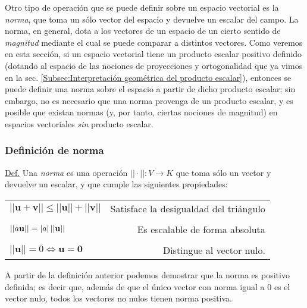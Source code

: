 Otro tipo de operación que se puede definir sobre un espacio vectorial es la \emph{norma}, que toma un sólo vector del espacio y devuelve un escalar del campo. La norma, en general, dota a los vectores de un espacio de un cierto sentido de \emph{magnitud} mediante el cual se puede comparar a distintos vectores. Como veremos en esta sección, si un espacio vectorial tiene un producto escalar positivo definido (dotando al espacio de las nociones de proyecciones y ortogonalidad que ya vimos en la sec. \ref{Subsec:Interpretación geométrica del producto escalar}), entonces se puede definir una norma sobre el espacio a partir de dicho producto escalar; sin embargo, no es necesario que una norma provenga de un producto escalar, y es posible que existan normas (y, por tanto, ciertas nociones de magnitud) en espacios vectoriales \emph{sin} producto escalar.

\subsubsection{Definición de norma} \label{Def:Norma}

\begin{tcolorbox}
\underline{Def.} Una \textit{norma} es una operación $||\cdot||:V\rightarrow K$ que toma sólo un vector y devuelve un escalar, y que cumple las siguientes propiedades:

\begin{center}
    \begin{tabular}{lr}
        $||\mathbf{u}+\mathbf{v}|| \leq ||\mathbf{u}|| + ||\mathbf{v}||$ & Satisface la desigualdad del triángulo \\ \\
        $||a\mathbf{u}|| = |a|\hspace{0.5mm}||\mathbf{u}||$ & Es escalable de forma absoluta \\ \\
        $||\mathbf{u}||=0\iff \mathbf{u}=\mathbf{0}$ & Distingue al vector nulo.
    \end{tabular}
\end{center}

\end{tcolorbox}{}

\vspace{3mm}
\noindent A partir de la definición anterior podemos demostrar que la norma es positivo definida; es decir que, además de que el único vector con norma igual a $0$ es el vector nulo, todos los vectores no nulos tienen norma positiva.

